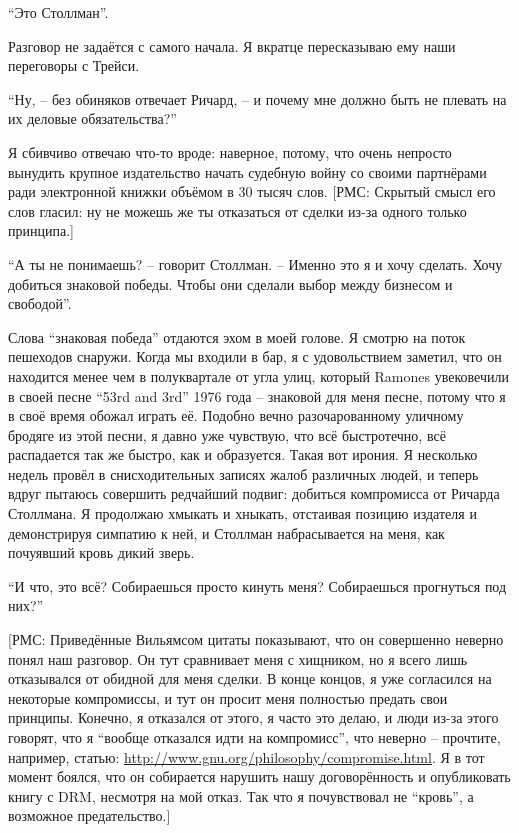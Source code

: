 ``Это Столлман''.

Разговор не задаётся с самого начала. Я вкратце пересказываю ему наши переговоры с Трейси.

``Ну, -- без обиняков отвечает Ричард, -- и почему мне должно быть не плевать на их деловые обязательства?''

Я сбивчиво отвечаю что-то вроде: наверное, потому, что очень непросто вынудить крупное издательство начать судебную войну со своими партнёрами ради электронной книжки объёмом в 30 тысяч слов. [РМС: Скрытый смысл его слов гласил: ну не можешь же ты отказаться от сделки из-за одного только принципа.]

``А ты не понимаешь? -- говорит Столлман. -- Именно это я и хочу сделать. Хочу добиться знаковой победы. Чтобы они сделали выбор между бизнесом и свободой''.

Слова ``знаковая победа'' отдаются эхом в моей голове. Я смотрю на поток пешеходов снаружи. Когда мы входили в бар, я с удовольствием заметил, что он находится менее чем в полуквартале от угла улиц, который Ramones увековечили в своей песне ``53rd and 3rd'' 1976 года -- знаковой для меня песне, потому что я в своё время обожал играть её. Подобно вечно разочарованному уличному бродяге из этой песни, я давно уже чувствую, что всё быстротечно, всё распадается так же быстро, как и образуется. Такая вот ирония. Я несколько недель провёл в снисходительных записях жалоб различных людей, и теперь вдруг пытаюсь совершить редчайший подвиг: добиться компромисса от Ричарда Столлмана. Я продолжаю хмыкать и хныкать, отстаивая позицию издателя и демонстрируя симпатию к ней, и Столлман набрасывается на меня, как почуявший кровь дикий зверь.

``И что, это всё? Собираешься просто кинуть меня? Собираешься прогнуться под них?''

[РМС: Приведённые Вильямсом цитаты показывают, что он совершенно неверно понял наш разговор. Он тут сравнивает меня с хищником, но я всего лишь отказывался от обидной для меня сделки. В конце концов, я уже согласился на некоторые компромиссы, и тут он просит меня полностью предать свои принципы. Конечно, я отказался от этого, я часто это делаю, и люди из-за этого говорят, что я ``вообще отказался идти на компромисс'', что неверно -- прочтите, например, статью: \url{http://www.gnu.org/philosophy/compromise.html}. Я в тот момент боялся, что он собирается нарушить нашу договорённость и опубликовать книгу с DRM, несмотря на мой отказ. Так что я почувствовал не ``кровь'', а возможное предательство.]

